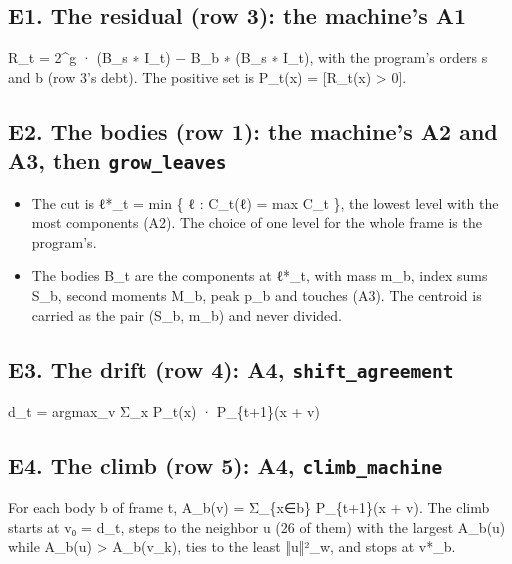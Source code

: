 \subsection{\texorpdfstring{E1. The residual (row 3): the machine's A1}{E1. The residual (row 3): the machine's A1}}

R\_\allowbreak{}t = 2\textasciicircum{}g · (B\_\allowbreak{}s ∗ I\_\allowbreak{}t) − B\_\allowbreak{}b ∗ (B\_\allowbreak{}s ∗ I\_\allowbreak{}t), with the program's orders s and b (row 3's debt). The positive set is P\_\allowbreak{}t(x) = [R\_\allowbreak{}t(x) > 0].

\subsection{\texorpdfstring{E2. The bodies (row 1): the machine's A2 and A3, then \texttt{grow\_\allowbreak{}leaves}}{E2. The bodies (row 1): the machine's A2 and A3, then grow\_leaves}}

\begin{itemize}
\item The cut is ℓ*\_\allowbreak{}t = min \{ ℓ : C\_\allowbreak{}t(ℓ) = max C\_\allowbreak{}t \}, the lowest level with the most components (A2). The choice of one level for the whole frame is the program's.
\item The bodies B\_\allowbreak{}t are the components at ℓ*\_\allowbreak{}t, with mass m\_\allowbreak{}b, index sums S\_\allowbreak{}b, second moments M\_\allowbreak{}b, peak p\_\allowbreak{}b and touches (A3). The centroid is carried as the pair (S\_\allowbreak{}b, m\_\allowbreak{}b) and never divided.
\end{itemize}

\subsection{\texorpdfstring{E3. The drift (row 4): A4, \texttt{shift\_\allowbreak{}agreement}}{E3. The drift (row 4): A4, shift\_agreement}}

d\_\allowbreak{}t = argmax\_\allowbreak{}v Σ\_\allowbreak{}x P\_\allowbreak{}t(x) · P\_\allowbreak{}\{t+1\}(x + v)

\subsection{\texorpdfstring{E4. The climb (row 5): A4, \texttt{climb\_\allowbreak{}machine}}{E4. The climb (row 5): A4, climb\_machine}}

For each body b of frame t, A\_\allowbreak{}b(v) = Σ\_\allowbreak{}\{x∈b\} P\_\allowbreak{}\{t+1\}(x + v). The climb starts at v₀ = d\_\allowbreak{}t, steps to the neighbor u (26 of them) with the largest A\_\allowbreak{}b(u) while A\_\allowbreak{}b(u) > A\_\allowbreak{}b(v\_\allowbreak{}k), ties to the least ‖u‖²\_\allowbreak{}w, and stops at v*\_\allowbreak{}b.

